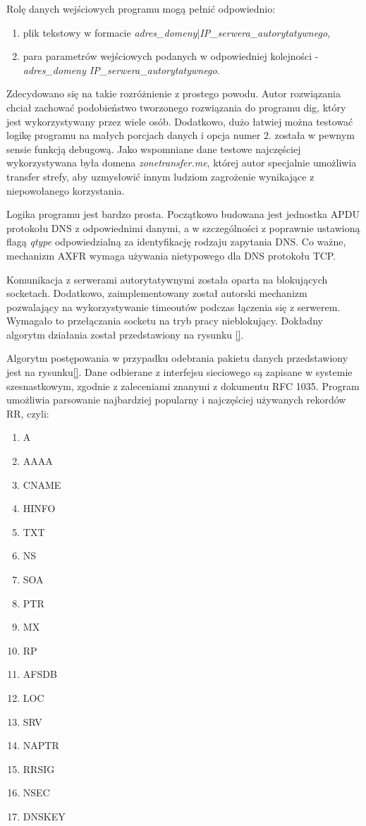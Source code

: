 Rolę danych wejściowych programu mogą pełnić odpowiednio:
\begin{enumerate}
	\item plik tekstowy w formacie \textit{adres\_domeny}|\textit{IP\_serwera\_autorytatywnego},
	\item para parametrów wejściowych podanych w odpowiedniej kolejności - \textit{adres\_domeny IP\_serwera\_autorytatywnego}. 
\end{enumerate}
Zdecydowano się na takie rozróżnienie z prostego powodu. Autor rozwiązania chciał zachować podobieństwo tworzonego rozwiązania do programu dig, który jest wykorzystywany przez wiele osób. Dodatkowo, dużo łatwiej można testować logikę programu na małych porcjach danych i opcja numer 2. została w pewnym sensie funkcją debugową. Jako wspomniane dane testowe najczęściej wykorzystywana była domena \textit{zonetransfer.me}\cite{zonetransfer}, której autor specjalnie umożliwia transfer strefy, aby uzmysłowić innym ludziom zagrożenie wynikające z niepowołanego korzystania.

Logika programu jest bardzo prosta. Początkowo budowana jest jednostka APDU protokołu DNS z odpowiednimi danymi, a w szczególności z poprawnie ustawioną flagą \textit{qtype} odpowiedzialną za identyfikację rodzaju zapytania DNS. Co ważne, mechanizm AXFR wymaga używania nietypowego dla DNS protokołu TCP.

Komunikacja z serwerami autorytatywnymi została oparta na blokujących socketach. Dodatkowo, zaimplementowany został autorski mechanizm pozwalający na wykorzystywanie timeoutów podczas łączenia się z serwerem. Wymagało to przełączania socketu na tryb pracy nieblokujący. Dokładny algorytm działania został przedstawiony na rysunku \ref{}.

Algorytm postępowania w przypadku odebrania pakietu danych przedstawiony jest na rysunku\ref{}. Dane odbierane z interfejsu sieciowego są zapisane w systemie szesnastkowym, zgodnie z zaleceniami znanymi z dokumentu RFC 1035\cite{RFC1035}. Program umożliwia parsowanie najbardziej popularny i najczęściej używanych rekordów RR, czyli:
\begin{enumerate}
	\item A
	\item AAAA
	\item CNAME
	\item HINFO
	\item TXT
	\item NS
	\item SOA
	\item PTR
	\item MX
	\item RP
	\item AFSDB
	\item LOC
	\item SRV
	\item NAPTR
	\item RRSIG
	\item NSEC
	\item DNSKEY
\end{enumerate} 

